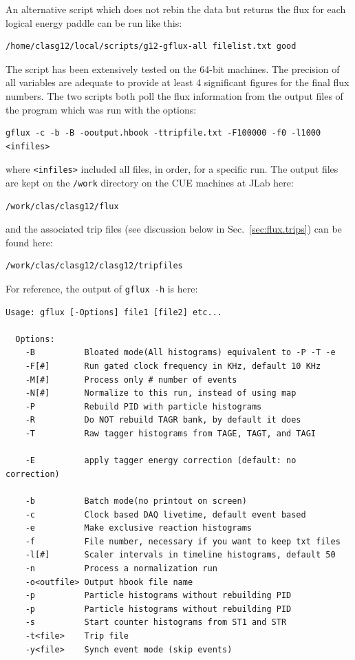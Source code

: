 An alternative script which does not rebin the data but returns the flux for each logical energy paddle can be run like this:
\begin{verbatim}
/home/clasg12/local/scripts/g12-gflux-all filelist.txt good
\end{verbatim}
The script has been extensively tested on the 64-bit machines. The precision of all variables are adequate to provide at least 4 significant figures for the final flux numbers. The two scripts both poll the flux information from the output files of the program  which was run with the options:
\begin{verbatim}
gflux -c -b -B -ooutput.hbook -ttripfile.txt -F100000 -f0 -l1000 <infiles>
\end{verbatim}
where \verb+<infiles>+ included all files, in order, for a specific run. The output files are kept on the \verb+/work+ directory on the CUE machines at JLab here:
\begin{verbatim}
/work/clas/clasg12/flux
\end{verbatim}
and the associated trip files (see discussion below in Sec.~\ref{sec:flux.trips}) can be found here:
\begin{verbatim}
/work/clas/clasg12/clasg12/tripfiles
\end{verbatim}
For reference, the output of \verb+gflux -h+ is here:
\begin{verbatim}
Usage: gflux [-Options] file1 [file2] etc...

  Options:
    -B          Bloated mode(All histograms) equivalent to -P -T -e
    -F[#]       Run gated clock frequency in KHz, default 10 KHz
    -M[#]       Process only # number of events
    -N[#]       Normalize to this run, instead of using map
    -P          Rebuild PID with particle histograms
    -R          Do NOT rebuild TAGR bank, by default it does
    -T          Raw tagger histograms from TAGE, TAGT, and TAGI

    -E          apply tagger energy correction (default: no correction)

    -b          Batch mode(no printout on screen)
    -c          Clock based DAQ livetime, default event based
    -e          Make exclusive reaction histograms
    -f          File number, necessary if you want to keep txt files
    -l[#]       Scaler intervals in timeline histograms, default 50
    -n          Process a normalization run
    -o<outfile> Output hbook file name
    -p          Particle histograms without rebuilding PID
    -p          Particle histograms without rebuilding PID
    -s          Start counter histograms from ST1 and STR
    -t<file>    Trip file
    -y<file>    Synch event mode (skip events)
\end{verbatim}


